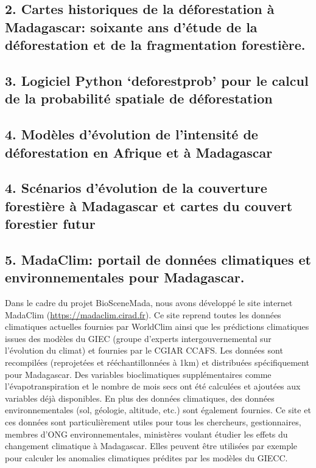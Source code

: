 \documentclass[]{article}
\begin{document}
\subsection{2. Cartes historiques de la déforestation à Madagascar:
soixante ans d'étude de la déforestation et de la fragmentation
forestière.}\label{cartes-historiques-de-la-deforestation-a-madagascar-soixante-ans-detude-de-la-deforestation-et-de-la-fragmentation-forestiere.}

\subsection{\texorpdfstring{3. Logiciel Python `deforestprob' pour le
calcul de la probabilité spatiale de
déforestation}{3. Logiciel Python deforestprob pour le calcul de la probabilité spatiale de déforestation}}\label{logiciel-python-deforestprob-pour-le-calcul-de-la-probabilite-spatiale-de-deforestation}

\subsection{4. Modèles d'évolution de l'intensité de déforestation en
Afrique et à
Madagascar}\label{modeles-devolution-de-lintensite-de-deforestation-en-afrique-et-a-madagascar}

\subsection{4. Scénarios d'évolution de la couverture forestière à
Madagascar et cartes du couvert forestier
futur}\label{scenarios-devolution-de-la-couverture-forestiere-a-madagascar-et-cartes-du-couvert-forestier-futur}

\subsection{5. MadaClim: portail de données climatiques et
environnementales pour
Madagascar.}\label{madaclim-portail-de-donnees-climatiques-et-environnementales-pour-madagascar.}

Dans le cadre du projet BioSceneMada, nous avons développé le site
internet MadaClim (\url{https://madaclim.cirad.fr}). Ce site reprend
toutes les données climatiques actuelles fournies par WorldClim ainsi
que les prédictions climatiques issues des modèles du GIEC (groupe
d'experts intergouvernemental sur l'évolution du climat) et fournies par
le CGIAR CCAFS. Les données sont recompilées (reprojetées et
rééchantillonnées à 1km) et distribuées spécifiquement pour Madagascar.
Des variables bioclimatiques supplémentaires comme l'évapotranspiration
et le nombre de mois secs ont été calculées et ajoutées aux variables
déjà disponibles. En plus des données climatiques, des données
environnementales (sol, géologie, altitude, etc.) sont également
fournies. Ce site et ces données sont particulièrement utiles pour tous
les chercheurs, gestionnaires, membres d'ONG environnementales,
ministères voulant étudier les effets du changement climatique à
Madagascar. Elles peuvent être utilisées par exemple pour calculer les
anomalies climatiques prédites par les modèles du GIECC.
\end{document}
